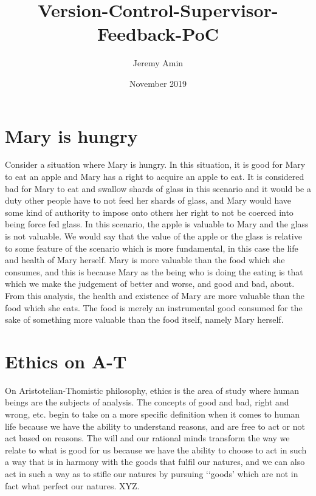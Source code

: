 \documentclass{article}
\title{Version-Control-Supervisor-Feedback-PoC}
\author{Jeremy Amin}
\date{November 2019}
\begin{document}
\maketitle
\tableofcontents

\pagebreak

\section{Mary is hungry}

Consider a situation where Mary is hungry. In this situation, it is good for Mary to eat an apple and Mary has a right to acquire an apple to eat. It is considered bad for Mary to eat and swallow shards of glass in this scenario and it would be a duty other people have to not feed her shards of glass, and Mary would have some kind of authority to impose onto others her right to not be coerced into being force fed glass. In this scenario, the apple is valuable to Mary and the glass is not valuable. We would say that the value of the apple or the glass is relative to some feature of the scenario which is more fundamental, in this case the life and health of Mary herself. Mary is more valuable than the food which she consumes, and this is because Mary as the being who is doing the eating is that which we make the judgement of better and worse, and good and bad, about. From this analysis, the health and existence of Mary are more valuable than the food which she eats. The food is merely an instrumental good consumed for the sake of something more valuable than the food itself, namely Mary herself.

\section{Ethics on A-T}

On Aristotelian-Thomistic philosophy, ethics is the area of study where human beings are the subjects of analysis. The concepts of good and bad, right and wrong, etc. begin to take on a more specific definition when it comes to human life because we have the ability to understand reasons, and are free to act or not act based on reasons. The will and our rational minds transform the way we relate to what is good for us because we have the ability to choose to act in such a way that is in harmony with the goods that fulfil our natures, and we can also act in such a way as to stifle our natures by pursuing ‘‘goods’ which are not in fact what perfect our natures. XYZ.
\end{document}
